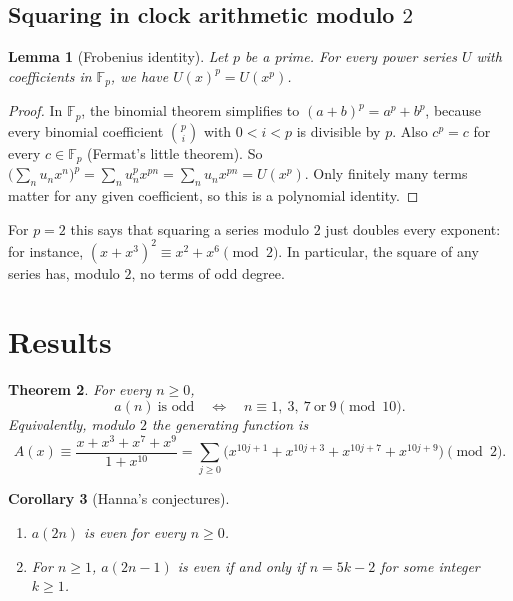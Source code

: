 \documentclass[11pt,a4paper]{article}
\newtheorem{theorem}{Theorem}[section]
\newtheorem{lemma}[theorem]{Lemma}
\newtheorem{corollary}[theorem]{Corollary}
\theoremstyle{definition}
\theoremstyle{remark}
\newcommand{\F}{\mathbb{F}}
\begin{document}
\subsection{Squaring in clock arithmetic modulo \texorpdfstring{$2$}{2}}
\begin{lemma}[Frobenius identity]\label{lem:frobenius}
Let $p$ be a prime. For every power series $U$ with coefficients in $\F_p$, we have $U(x)^p=U(x^p)$.
\end{lemma}

\begin{proof}
In $\F_p$, the binomial theorem simplifies to $(a+b)^p=a^p+b^p$, because every binomial coefficient
$\binom pi$ with $0<i<p$ is divisible by $p$. Also $c^p=c$ for every $c\in\F_p$ (Fermat's little theorem). So
$\bigl(\sum_nu_nx^n\bigr)^p=\sum_nu_n^px^{pn}=\sum_nu_nx^{pn}=U(x^p)$. Only finitely many terms matter for any given
coefficient, so this is a polynomial identity.
\end{proof}

For $p=2$ this says that squaring a series modulo $2$ just doubles every exponent: for instance,
$(x+x^3)^2\equiv x^2+x^6\pmod2$. In particular, the square of any series has, modulo $2$, no terms of odd degree.


\section{Results}\label{sec:results}

\begin{theorem}\label{thm:main}
For every $n\ge0$,
\[
a(n)\ \text{is odd}\quad\Longleftrightarrow\quad n\equiv 1,\ 3,\ 7\ \text{or}\ 9 \pmod{10}.
\]
Equivalently, modulo $2$ the generating function is
\begin{equation}\label{eq:key}
A(x)\equiv\frac{x+x^3+x^7+x^9}{1+x^{10}}=\sum_{j\ge0}\bigl(x^{10j+1}+x^{10j+3}+x^{10j+7}+x^{10j+9}\bigr)\pmod 2 .
\end{equation}
\end{theorem}

\begin{corollary}[Hanna's conjectures]\label{cor:conj}
\begin{enumerate}[label=(\alph*)]
\item $a(2n)$ is even for every $n\ge0$.
\item For $n\ge1$, $a(2n-1)$ is even if and only if $n=5k-2$ for some integer $k\ge1$.
\end{enumerate}
\end{corollary}
\end{document}

